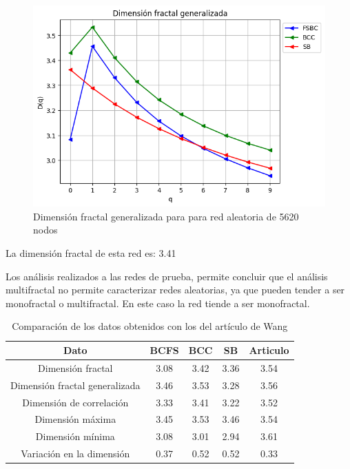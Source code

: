 \begin{figure}[H]
    \centering
    \includegraphics[scale=0.7]{Capitulo4Multifractalidad/imagenes/a_Dqrandom5620.png}
    \caption{Dimensión fractal generalizada para para red aleatoria de 5620 nodos}
\end{figure}

La dimensión fractal de esta red es: 3.41

Los análisis realizados a las redes de prueba, permite concluir que el análisis multifractal no permite caracterizar redes aleatorias, ya que pueden tender a ser monofractal o multifractal. En este caso la red tiende a ser monofractal.

\begin{table}[H]
    \centering
    \begin{tabular}{|c|c|c|c|c|}
        \hline
         \textbf{Dato}& \textbf{BCFS} & \textbf{BCC} & \textbf{SB} & \textbf{Articulo} \\
         \hline
         Dimensión fractal & 3.08 & 3.42 & 3.36 & 3.54\\
         \hline
         Dimensión fractal generalizada  & 3.46 & 3.53 & 3.28 & 3.56 \\
         \hline
         Dimensión de correlación & 3.33 & 3.41  & 3.22 &3.52 \\
         \hline
         Dimensión máxima & 3.45 & 3.53 & 3.46 & 3.54\\
         \hline
         Dimensión mínima & 3.08 & 3.01 & 2.94 & 3.61\\
         \hline
         Variación en la dimensión & 0.37 &  0.52 & 0.52 & 0.33 \\
         \hline
    \end{tabular}
    \caption{Comparación de los datos obtenidos con los del artículo de Wang\cite{Wang2012}}
\end{table}

